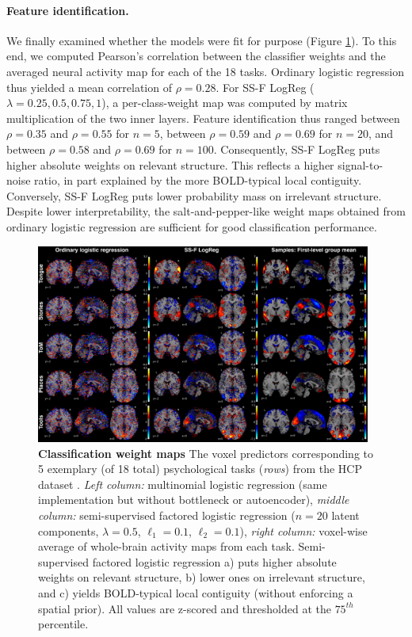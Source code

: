 \documentclass{article} %
\begin{document}
\paragraph{Feature identification.}
We finally examined whether the models
were fit for purpose
(Figure \ref{fig_weights}).
%
To this end, we computed Pearson's correlation between the classifier weights
and the averaged neural activity map for each of the 18 tasks.
%
Ordinary logistic regression thus yielded a mean correlation
of $\rho=0.28$.
%
For SS-F LogReg ($\lambda=0.25, 0.5, 0.75, 1$),
a per-class-weight map was computed by matrix
multiplication of the two inner layers.
Feature identification thus ranged
between $\rho=0.35$ and $\rho=0.55$ for $n=5$,
between $\rho=0.59$ and $\rho=0.69$ for $n=20$, and
between $\rho=0.58$ and $\rho=0.69$ for $n=100$.
%
Consequently,
SS-F LogReg puts higher absolute weights on relevant structure.
This reflects a higher signal-to-noise ratio, in part explained
by the more BOLD-typical local contiguity.
%
Conversely, SS-F LogReg puts lower probability mass on irrelevant structure.
Despite lower interpretability, the
salt-and-pepper-like weight maps obtained from
ordinary logistic regression are sufficient for
good classification performance.
%
\begin{figure}
\begin{centering}
\includegraphics[width=0.98\textwidth]{figures/figure_weights_perc75.png}
\end{centering}
\vspace{-0.1cm}
\caption{\textbf{Classification weight maps}
The voxel predictors corresponding to 5 exemplary
(of 18 total) psychological tasks (\textit{rows})
from the HCP dataset \cite{barch2013}.
\textit{Left column:} multinomial logistic regression (same
implementation but without bottleneck or autoencoder),
\textit{middle column:} semi-supervised factored logistic regression
($n=20$ latent components, $\lambda=0.5$, $\ell_1=0.1$, $\ell_2=0.1$),
\textit{right column:} voxel-wise average of whole-brain
activity maps from each task.
Semi-supervised factored logistic regression
a) puts higher absolute weights on relevant structure,
b) lower ones on irrelevant structure,
and
c) yields BOLD-typical local contiguity (without enforcing a spatial prior).
All values are z-scored and thresholded at the $75^{th}$ percentile.
}
\label{fig_weights}
\end{figure}
\end{document}
